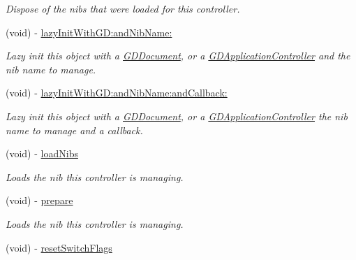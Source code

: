 \begin{DoxyCompactItemize}
\begin{DoxyCompactList}\small\item\em Dispose of the nibs that were loaded for this controller. \item\end{DoxyCompactList}\item 
(void) -\/ \hyperlink{interface_g_d_external_nib_controller_afbf8e576d3002582a58fe45aef1ddb83}{lazyInitWithGD:andNibName:}
\begin{DoxyCompactList}\small\item\em Lazy init this object with a \hyperlink{interface_g_d_document}{GDDocument}, or a \hyperlink{interface_g_d_application_controller}{GDApplicationController} and the nib name to manage. \item\end{DoxyCompactList}\item 
(void) -\/ \hyperlink{interface_g_d_external_nib_controller_adfdd072ce438169e09f1ee61d227222c}{lazyInitWithGD:andNibName:andCallback:}
\begin{DoxyCompactList}\small\item\em Lazy init this object with a \hyperlink{interface_g_d_document}{GDDocument}, or a \hyperlink{interface_g_d_application_controller}{GDApplicationController} the nib name to manage and a callback. \item\end{DoxyCompactList}\item 
\hypertarget{interface_g_d_external_nib_controller_a6a973011a86b0d38e853eb66b938f648}{
(void) -\/ \hyperlink{interface_g_d_external_nib_controller_a6a973011a86b0d38e853eb66b938f648}{loadNibs}}
\label{interface_g_d_external_nib_controller_a6a973011a86b0d38e853eb66b938f648}

\begin{DoxyCompactList}\small\item\em Loads the nib this controller is managing. \item\end{DoxyCompactList}\item 
(void) -\/ \hyperlink{interface_g_d_external_nib_controller_a362ec726c2ae1d8239f8ea966b2d40b0}{prepare}
\begin{DoxyCompactList}\small\item\em Loads the nib this controller is managing. \item\end{DoxyCompactList}\item 
\hypertarget{interface_g_d_external_nib_controller_ad9f8f2f835f58689b83c6aa4a3497539}{
(void) -\/ \hyperlink{interface_g_d_external_nib_controller_ad9f8f2f835f58689b83c6aa4a3497539}{resetSwitchFlags}}
\label{interface_g_d_external_nib_controller_ad9f8f2f835f58689b83c6aa4a3497539}


\end{DoxyCompactItemize}
